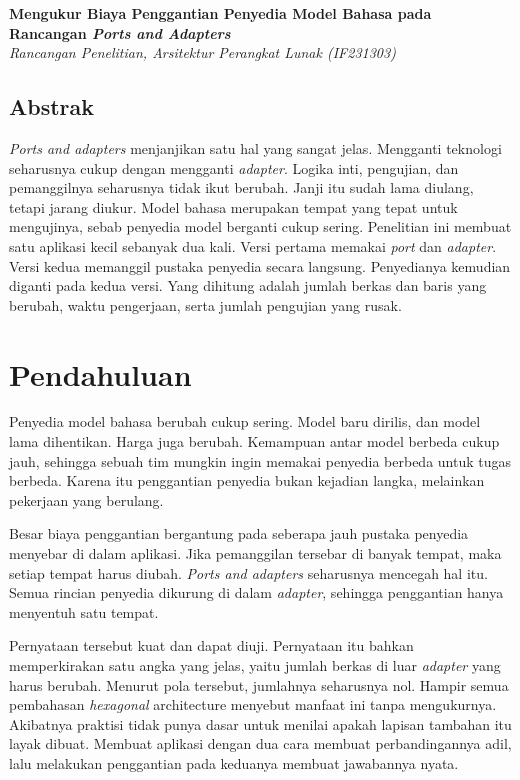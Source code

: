 \documentclass[11pt,a4paper]{article}
\begin{document}
\begin{center}
  {\LARGE\bfseries Mengukur Biaya Penggantian Penyedia Model Bahasa pada Rancangan \textit{Ports and Adapters}}\\[0.6em]
  {\small\itshape Rancangan Penelitian, Arsitektur Perangkat Lunak (IF231303)}
\end{center}

\vspace{1em}

\subsection*{Abstrak}

\textit{Ports and adapters} menjanjikan satu hal yang sangat jelas. Mengganti teknologi seharusnya cukup dengan mengganti \textit{adapter}. Logika inti, pengujian, dan pemanggilnya seharusnya tidak ikut berubah. Janji itu sudah lama diulang, tetapi jarang diukur. Model bahasa merupakan tempat yang tepat untuk mengujinya, sebab penyedia model berganti cukup sering. Penelitian ini membuat satu aplikasi kecil sebanyak dua kali. Versi pertama memakai \textit{port} dan \textit{adapter}. Versi kedua memanggil pustaka penyedia secara langsung. Penyedianya kemudian diganti pada kedua versi. Yang dihitung adalah jumlah berkas dan baris yang berubah, waktu pengerjaan, serta jumlah pengujian yang rusak.

\section{Pendahuluan}

Penyedia model bahasa berubah cukup sering. Model baru dirilis, dan model lama dihentikan. Harga juga berubah. Kemampuan antar model berbeda cukup jauh, sehingga sebuah tim mungkin ingin memakai penyedia berbeda untuk tugas berbeda. Karena itu penggantian penyedia bukan kejadian langka, melainkan pekerjaan yang berulang.

Besar biaya penggantian bergantung pada seberapa jauh pustaka penyedia menyebar di dalam aplikasi. Jika pemanggilan tersebar di banyak tempat, maka setiap tempat harus diubah. \textit{Ports and adapters} seharusnya mencegah hal itu. Semua rincian penyedia dikurung di dalam \textit{adapter}, sehingga penggantian hanya menyentuh satu tempat.

Pernyataan tersebut kuat dan dapat diuji. Pernyataan itu bahkan memperkirakan satu angka yang jelas, yaitu jumlah berkas di luar \textit{adapter} yang harus berubah. Menurut pola tersebut, jumlahnya seharusnya nol. Hampir semua pembahasan \textit{hexagonal} architecture menyebut manfaat ini tanpa mengukurnya. Akibatnya praktisi tidak punya dasar untuk menilai apakah lapisan tambahan itu layak dibuat. Membuat aplikasi dengan dua cara membuat perbandingannya adil, lalu melakukan penggantian pada keduanya membuat jawabannya nyata.
\end{document}
